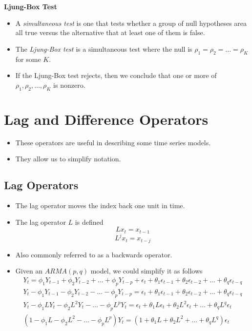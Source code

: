 \documentclass[11pt]{article}
\begin{document}
\textbf{Ljung-Box Test}
\begin{itemize}
    \item A \textit{simultaneous test} is one that tests whether a group of null hypotheses area
    all true versus the alternative that at least one of them is false.
    \item The \textit{Ljung-Box test} is a simultaneous test where the null is $\rho_1 = \rho_2
    = \hdots =\rho_K$ for some $K$. 
    \item If the Ljung-Box test rejects, then we conclude that one or more of $\rho_1, \rho_2, 
    \ldots, \rho_K$ is nonzero. 
\end{itemize}

\section{Lag and Difference Operators}
\begin{itemize}
    \item These operators are useful in describing some time series models.
    \item They allow us to simplify notation. 
\end{itemize}
\subsection{Lag Operators}
\begin{itemize}
    \item The lag operator moves the index back one unit in time.
    \item The lag operator $L$ is defined 
    \[ L x_t = x_{t-1}\]
    \[ L^j x_t = x_{t-j}\]
    \item Also commonly referred to as a backwards operator. 
    \item Given an $ARMA(p,q)$ model, we could simplify it as follows 
    \begin{align*}
        Y_t = \phi_1 Y_{t-1} + \phi_2 Y_{t-2} + \hdots + \phi_p Y_{t-p} + \epsilon_t + \theta_1
        \epsilon_{t-1} + \theta_2 \epsilon_{t-2} + \hdots + \theta_q \epsilon_{t-q} \\ 
        Y_t - \phi_1 Y_{t-1} - \phi_2 Y_{t-2} - \hdots - \phi_p Y_{t-p} = \epsilon_t + \theta_1
        \epsilon_{t-1} + \theta_2 \epsilon_{t-2} + \hdots + \theta_q \epsilon_{t-q} \\ 
        Y_t - \phi_1 L Y_{t} - \phi_2 L^2 Y_{t} - \hdots - \phi_p L^p Y_{t} = \epsilon_t + 
        \theta_1 L \epsilon_{t} + \theta_2 L^2 \epsilon_{t} + \hdots + \theta_q L^q 
        \epsilon_{t} \\ 
        (1 - \phi_1 L - \phi_2 L^2 - \hdots - \phi_p L^p)Y_t = (1 + \theta_1 L + \theta_2 L^2 
        + \hdots + \theta_q L^q) \epsilon_t \\ 
    \end{align*}
\end{itemize}
\end{document}
